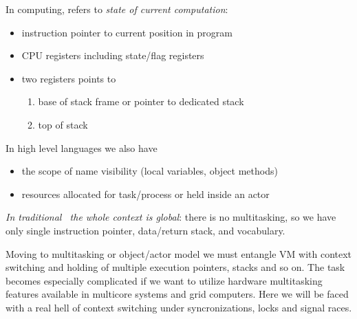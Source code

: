
In computing,  refers to \emph{state of current computation}:
\begin{itemize}[nosep]
  \item
instruction pointer to current position in program
  \item
CPU registers including state/flag registers 
  \item
two registers points to
\begin{enumerate}[nosep]
  \item base of stack frame or pointer to dedicated stack
  \item top of stack
\end{enumerate} 
\end{itemize} 
\medskip
In high level languages we also have
\begin{itemize}[nosep]
  \item the scope of name visibility (local variables, object methods)
  \item resources allocated for task/process or held inside an actor
\end{itemize}

\clearpage\noindent
\emph{In traditional \F\ the whole context is global}: there is no multitasking,
so we have only single instruction pointer, data/return stack, and
vocabulary.

Moving to multitasking or object/actor model we must entangle VM with context
switching and holding of multiple execution pointers, stacks and so on. The task
becomes especially complicated if we want to utilize hardware multitasking
features available in multicore systems and grid computers. Here we will be
faced with a real hell of context switching under syncronizations, locks and
signal races.
